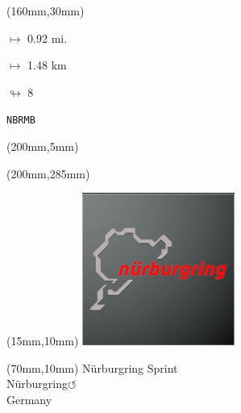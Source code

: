 \begin{textblock*}{40mm}(160mm,30mm)%
\Large
\par$\mapsto$ 0.92 mi.
\par$\mapsto$ 1.48 km
\par$\looparrowright$ 8
\par\hfill\tiny\tt NBRMB\\
\end{textblock*}
\begin{textblock*}{20mm}(200mm,5mm)%
\fbox{\thepage}
\label{NBRMB}
\end{textblock*}
\begin{textblock*}{20mm}(200mm,285mm)%
\fbox{\thepage}
\end{textblock*}

\null\newpage
\begin{textblock*}{50mm}(15mm,10mm)%
\includegraphics[width=50mm]{LG/2015-05-20_00089.png}
\end{textblock*}
\begin{textblock*}{130mm}(70mm,10mm)%
{\fontsize{20}{20}\selectfont Nürburgring Sprint\\}
{\fontsize{16}{16}\selectfont Nürburgring\hfill \huge$\circlearrowleft$\\}
{\fontsize{12}{12}\selectfont Germany\\}
\end{textblock*}
